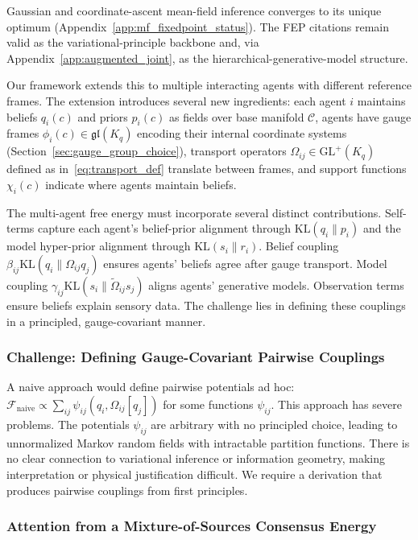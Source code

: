 \documentclass[11pt]{article}
\begin{document}
Gaussian and coordinate-ascent mean-field inference converges to its unique optimum (Appendix~\ref{app:mf_fixedpoint_status}). The FEP citations remain valid as the variational-principle backbone and, via Appendix~\ref{app:augmented_joint}, as the hierarchical-generative-model structure.

Our framework extends this to multiple interacting agents with different reference frames. The extension introduces several new ingredients: each agent $i$ maintains beliefs $q_i(c)$ and priors $p_i(c)$ as fields over base manifold $\mathcal{C}$, agents have gauge frames $\phi_i(c) \in \mathfrak{gl}(K_q)$ encoding their internal coordinate systems (Section~\ref{sec:gauge_group_choice}), transport operators $\Omega_{ij} \in \mathrm{GL}^+(K_q)$ defined as in~\eqref{eq:transport_def} translate between frames, and support functions $\chi_i(c)$ indicate where agents maintain beliefs.

The multi-agent free energy must incorporate several distinct contributions. Self-terms capture each agent's belief-prior alignment through $\mathrm{KL}(q_i \| p_i)$ and the model hyper-prior alignment through $\mathrm{KL}(s_i \| r_i)$. Belief coupling $\beta_{ij}\mathrm{KL}(q_i\|\Omega_{ij}q_j)$ ensures agents' beliefs agree after gauge transport. Model coupling $\gamma_{ij}\mathrm{KL}(s_i\|\tilde{\Omega}_{ij}s_j)$ aligns agents' generative models. Observation terms ensure beliefs explain sensory data. The challenge lies in defining these couplings in a principled, gauge-covariant manner.

\subsubsection{Challenge: Defining Gauge-Covariant Pairwise Couplings}

A naive approach would define pairwise potentials ad hoc: $\mathcal{F}_{\text{naive}} \propto \sum_{ij} \psi_{ij}(q_i, \Omega_{ij}[q_j])$ for some functions $\psi_{ij}$. This approach has severe problems. The potentials $\psi_{ij}$ are arbitrary with no principled choice, leading to unnormalized Markov random fields with intractable partition functions. There is no clear connection to variational inference or information geometry, making interpretation or physical justification difficult. We require a derivation that produces pairwise couplings from first principles.

\subsubsection{Attention from a Mixture-of-Sources Consensus Energy}
\label{sec:mixture_derivation}
\end{document}
